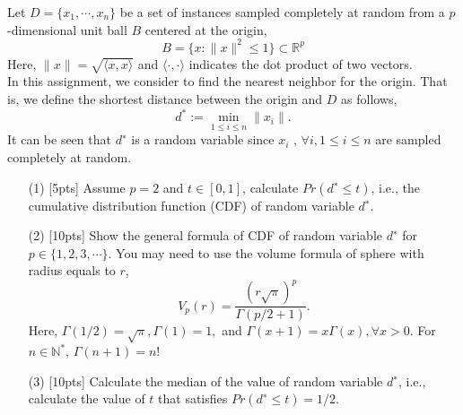 \begin{problem}
    Let $D = \{x_1, \cdots, x_n\}$ be a set of instances sampled completely at random from
    a $p$-dimensional unit ball $B$ centered at the origin,
    \[B=\{x:\|x\|^2\leq 1\}\subset\mathbb{R}^{p}\]
    Here, $\|x\| =\sqrt{\langle x,x\rangle}$ and $\langle\cdot,\cdot\rangle$ indicates the dot product of two vectors.\\
    In this assignment, we consider to find the nearest neighbor for the origin.
    That is, we define the shortest distance between the origin and $D$ as follows,
    \[d^*:=\min_{1\leq i\leq n}\|x_i\|.\]
    It can be seen that $d^∗$ is a random variable since $x_i$ , $\forall i, 1 \leq i \leq n$ are sampled completely at random.
    \begin{enumerate}
        \item[(1)] [5pts] Assume $p = 2$ and $t \in [0, 1]$, calculate $Pr(d^∗ \leq t)$, i.e., the cumulative distribution function (CDF) of random variable $d^∗$.
        \item[(2)] [10pts] Show the general formula of CDF of random variable $d^∗$ for $p \in\{1, 2, 3,\cdots \}$. You may need to use the volume formula of sphere with radius equals to $r$,
            \[V_{p}(r)=\frac{(r\sqrt{\pi})^p}{\Gamma(p/2+1)}.\]
            Here, $\Gamma(1/2)=\sqrt{\pi},\Gamma(1)=1,$ and $\Gamma(x+1)=x\Gamma(x),\forall x>0$. For $n\in\mathbb{N}^*$, $\Gamma(n+1)=n!$
        \item[(3)] [10pts] Calculate the median of the value of random variable $d^∗$, i.e., calculate the value of $t$ that satisfies $Pr(d^∗ \leq t) = 1/2$.
    \end{enumerate}
\end{problem}



